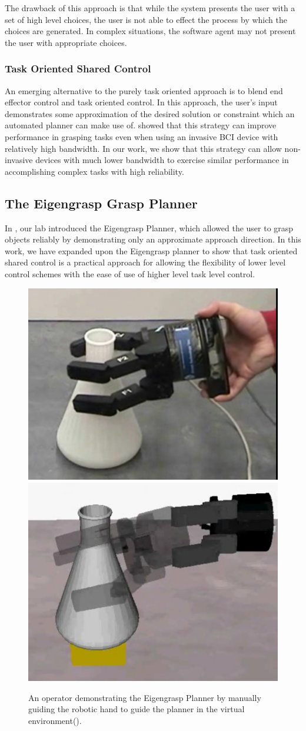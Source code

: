 The drawback of this approach is that while the system presents the user with a set of high level choices, the user is not able to effect the process by which the choices are generated. In complex situations, the software agent may not present the user with appropriate choices. 

\subsubsection{Task Oriented Shared Control}
An emerging alternative to the purely task oriented approach is to blend end effector control and task oriented control. In this approach, the user's input demonstrates some approximation of the desired solution or constraint which an automated planner can make use of. \cite{Mulling2015} showed that this strategy can improve performance in grasping tasks even when using an invasive BCI device with relatively high bandwidth. In our work, we show that this strategy can allow non-invasive devices with much lower bandwidth to exercise similar performance in accomplishing complex tasks with high reliability. 

\subsection{The Eigengrasp Grasp Planner}
 In \cite{CiocarlieIJRR}, our lab introduced the Eigengrasp Planner, which allowed the user to grasp objects reliably by demonstrating only an approximate approach direction. In this work, we have expanded upon the Eigengrasp planner to show that task oriented shared control is a practical approach for allowing the flexibility of lower level control schemes with the ease of use of higher level task level control. 

\begin{figure}[hb]
\centering
	\includegraphics[width=.49\textwidth]{images_2/real_eg_grasp.png}
	\includegraphics[width=.49\textwidth]{images_2/simulated_eg_grasp2.png}
	\caption{An operator demonstrating the Eigengrasp Planner by manually guiding the robotic hand to guide the planner in the virtual environment(\cite{CiocarlieIJRR}).}
	\label{fig:egplanner_demo} 
\end{figure}

